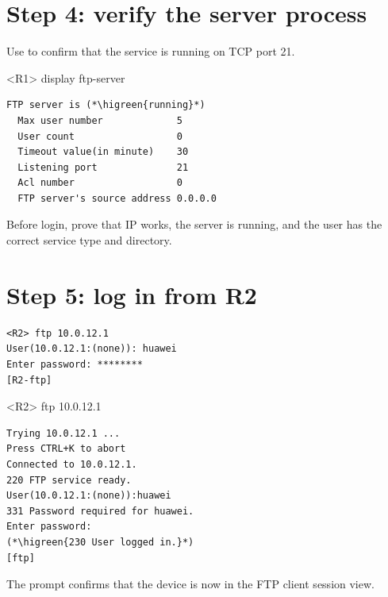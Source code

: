 \section{Step 4: verify the server process}
Use  to confirm that the service is running on TCP port 21.

\begin{vrpbox}{<R1> display ftp-server}
\begin{lstlisting}[style=vrp]
  FTP server is (*\higreen{running}*)
  Max user number             5
  User count                  0
  Timeout value(in minute)    30
  Listening port              21
  Acl number                  0
  FTP server's source address 0.0.0.0
\end{lstlisting}
\end{vrpbox}

\begin{verification}
Before login, prove that IP works, the server is running, and the user has the correct service type and directory.
\end{verification}

\section{Step 5: log in from R2}
\begin{lstlisting}[style=utpterminal]
<R2> ftp 10.0.12.1
User(10.0.12.1:(none)): huawei
Enter password: ********
[R2-ftp]
\end{lstlisting}

\begin{vrpbox}{<R2> ftp 10.0.12.1}
\begin{lstlisting}[style=vrp]
Trying 10.0.12.1 ...
Press CTRL+K to abort
Connected to 10.0.12.1.
220 FTP service ready.
User(10.0.12.1:(none)):huawei
331 Password required for huawei.
Enter password:
(*\higreen{230 User logged in.}*)
[ftp]
\end{lstlisting}
\end{vrpbox}

The \cmd{[R2-ftp]} prompt confirms that the device is now in the FTP client session view.

